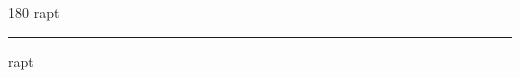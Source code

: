 
\begin{frame}
\begin{center}
\begin{turn}{180}
{\fontsize{2.5cm}{1em}\selectfont rapt}
\end{turn}
\vspace{1em}\par  
\hrule
\vspace{1em}\par  
{\fontsize{2.5cm}{1em}\selectfont rapt}
\end{center}
\end{frame}

